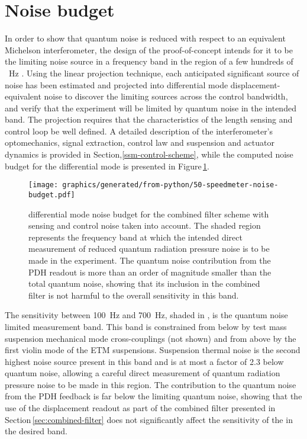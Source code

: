 \section{\label{sec:noise-budget}Noise budget}

In order to show that quantum noise is reduced with respect to an equivalent Michelson interferometer, the design of the proof-of-concept \SSM{} intends for it to be the limiting noise source in a frequency band in the region of a few hundreds of \SI{}{\hertz} \cite{Graef2014}. Using the linear projection technique, each anticipated significant source of noise has been estimated and projected into differential mode displacement-equivalent noise to discover the limiting sources across the control bandwidth, and verify that the experiment will be limited by quantum noise in the intended band. The projection requires that the characteristics of the length sensing and control loop be well defined. A detailed description of the interferometer's optomechanics, signal extraction, control law and suspension and actuator dynamics is provided in Section,\ref{ssm-control-scheme}, while the computed noise budget for the differential mode is presented in Figure\,\ref{fig:noise-budget}.

\begin{figure}
  \texttt{[image: graphics/generated/from-python/50-speedmeter-noise-budget.pdf]}
  \caption{\label{fig:noise-budget}\SSM{} differential mode noise budget for the combined filter scheme with sensing and control noise taken into account. The shaded region represents the frequency band at which the intended direct measurement of reduced quantum radiation pressure noise is to be made in the experiment. The quantum noise contribution from the PDH readout is more than an order of magnitude smaller than the total quantum noise, showing that its inclusion in the combined filter is not harmful to the overall sensitivity in this band.}
\end{figure}

The sensitivity between \SI{100}{\hertz} and \SI{700}{\hertz}, shaded in , is the quantum noise limited measurement band. This band is constrained from below by test mass suspension mechanical mode cross-couplings (not shown) and from above by the first violin mode of the ETM suspensions. Suspension thermal noise is the second highest noise source present in this band and is at most a factor of \SI{2.3}{} below quantum noise, allowing a careful direct measurement of quantum radiation pressure noise to be made in this region. The contribution to the quantum noise from the PDH feedback is far below the limiting quantum noise, showing that the use of the displacement readout as part of the combined filter presented in Section\,\ref{sec:combined-filter} does not significantly affect the sensitivity of the \SSM{} in the desired band.

